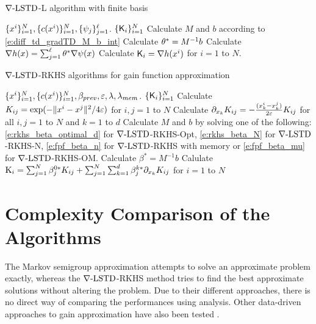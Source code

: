 \begin{algorithm}{$\nabla\text{-LSTD}$-L algorithm with finite basis}
	\begin{algorithmic}[1]
		\Require $\{x^i\}_{i=1}^N, \{c(x^i)\}_{i=1}^N, \{\psi_j\}_{j=1}^{\ell}$.
		\Ensure $\{\text{\sf K}_i\}_{i=1}^N$
		\State Calculate $M$ and $b$ according to \eqref{e:diff_td_gradTD_M_b_int}
		\State Calculate $\theta^* = M^{-1}b$
		\State Calculate $\nabla h(x)  =  \sum_{j=1}^{\ell}  \theta^* \nabla \psi(x)$  
		\State Calculate $\text{\sf K}_i = \nabla h(x^i)$ for $i=1$ to $N$. 
	\end{algorithmic}
\end{algorithm} 


\label{alg:rkhs}
\begin{algorithm}{$\nabla\text{-LSTD}$-RKHS algorithms for gain function approximation}
	\begin{algorithmic}[1]
		\Require $\{x^i\}_{i=1}^N, \{c(x^i)\}_{i=1}^N, \beta_{prev}, \varepsilon, \lambda, \lambda_{mem}$.
		\Ensure $\{\text{\sf K}_i\}_{i=1}^N$
		\State Calculate $K_{ij} = \exp(-\|x^i - x^j\|^2/ 4\varepsilon)$ for $i,j = 1$ to $N$  
		\State Calculate $ \partial_{x_k}K_{ij} = -\frac{(x_k^i - x_k^j)}{2\varepsilon} K_{ij}$ for all $i,j =1$ to $N$ and $k = 1$ to $d$ 
		\State Calculate $M$ and $b$ by solving one of the following: \eqref{e:rkhs_beta_optimal_d} for $\nabla\text{-LSTD}$-RKHS-Opt, \eqref{e:rkhs_beta_N} for $\nabla\text{-LSTD}$-RKHS-N, \eqref{e:fpf_beta_n} for $\nabla\text{-LSTD}$-RKHS with memory or \eqref{e:fpf_beta_mu} for $\nabla\text{-LSTD}$-RKHS-OM.  
		\State Calculate $\beta^* = M^{-1}b$
		\State Calulate $\text{K}_i  =  \sum_{j=1}^N  \beta^{0*}_j K_{ij} + \sum_{j=1}^N \sum_{k=1}^d \beta^{k*}_j \partial_{x_k} K_{ij}$ for $i =1$ to $N$ 
	\end{algorithmic}
\end{algorithm}

\section{Complexity Comparison of the Algorithms}
\label{s:computational_complexity}
The Markov semigroup approximation attempts to solve an approximate problem exactly, whereas the $\nabla\text{-LSTD}$-RKHS method tries to find the best approximate solutions without altering the problem. Due to their different approaches, there is no direct way of comparing the performances using analysis. %
Other data-driven approaches to gain approximation have also been tested \cite{bergro16}. %
